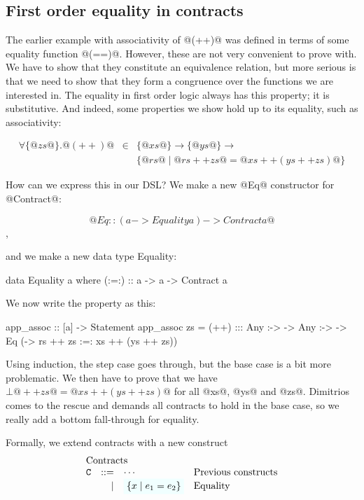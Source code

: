 \subsection{First order equality in contracts}

The earlier example with associativity of @(++)@ was defined in terms
of some equality function @(==)@. However, these are not very
convenient to prove with. We have to show that they constitute an
equivalence relation, but more serious is that we need to show that
they form a congruence over the functions we are interested in. The
equality in first order logic always has this property; it is
substitutive. And indeed, some properties we show hold up to its
equality, such as associativity:

\[\begin{array}{rcl}
\forall \{ @zs@ \} . @(++)@ & \in & \{ @xs@ \} \to \{ @ys@ \} \to \\
                            &     & \{ @rs@ \mid @rs ++ zs@ = @xs ++ (ys ++ zs)@ \}
\end{array}\]

How can we express this in our DSL? We make a new @Eq@ constructor for @Contract@:

$$@Eq :: (a -> Equality a) -> Contract a@$$,

and we make a new data type Equality:

\begin{code}
data Equality a where
    (:=:) :: a -> a -> Contract a
\end{code}

We now write the property as this:

\begin{code}
app_assoc :: [a] -> Statement
app_assoc zs = (++) :::
    Any :-> \xs -> Any :-> \ys -> Eq
        (\rs -> rs ++ zs :=: xs ++ (ys ++ zs))
\end{code}

Using induction, the step case goes through, but the base case is a
bit more problematic. We then have to prove that we have
$\bot @++ zs@ = @xs ++ (ys ++ zs)@$ for all @xs@, @ys@ and @zs@.
Dimitrios comes to the rescue and demands all contracts to hold in the
base case, so we really add a bottom fall-through for equality.

Formally, we extend contracts with a new construct
\[\begin{array}{lrll}
\multicolumn{3}{l}{\text{Contracts}} \\
 \Ct & ::=  & \cdots                 & \text{Previous constructs} \\
     & \mid & \formula{\{ x \mid e_1 = e_2 \}} & \text{Equality}
\end{array}\]

